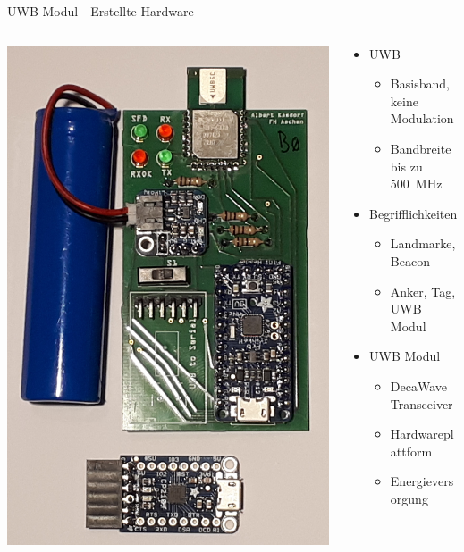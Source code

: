 \documentclass{beamer}
\begin{document}
\begin{frame}{UWB Modul - Erstellte Hardware}
	\begin{columns}
		\begin{column}{0.5\linewidth}
			\centering
			\includegraphics[width=0.8\linewidth]{uwb_modul2}
		\end{column}
		\begin{column}{0.5\linewidth}
			\begin{itemize}
				\item<1-> UWB
				\begin{itemize}
					\item Basisband, keine Modulation
					\item Bandbreite bis zu \SI{500}{\MHz}
				\end{itemize}
				\item<2-> Begrifflichkeiten
				\begin{itemize}
					\item Landmarke, Beacon
					\item Anker, Tag, UWB Modul
				\end{itemize}
				\item<3-> UWB Modul
				\begin{itemize}
					\item DecaWave Transceiver
					\item Hardwareplattform
					\item Energieversorgung
				\end{itemize}
			\end{itemize}
		\end{column}
	\end{columns}
\end{frame}
\end{document}
